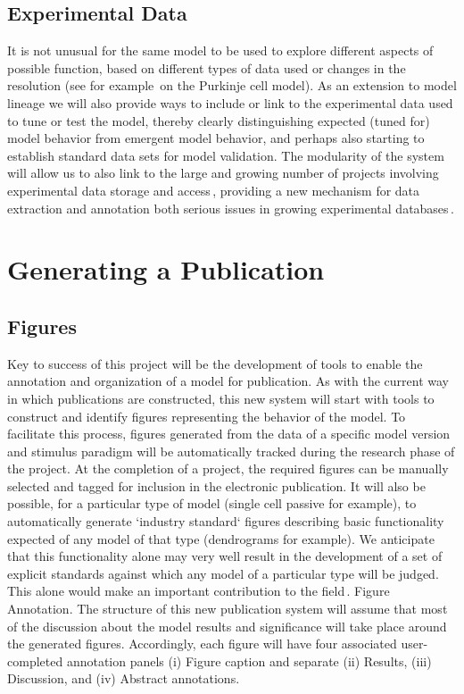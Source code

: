 \documentclass[12pt]{article}
\begin{document}
\subsection*{Experimental Data}

It is not unusual for the same model to be used to explore different aspects of possible function, based on different types of data used or changes in the resolution (see for example\,\cite{De-Schutter-E:1994vn, E:1994hc, schutter94:_simul_purkin, schutter94:_simul_purkin} on the Purkinje cell model). As an extension to model lineage we will also provide ways to include or link to the experimental data used to tune or test the model, thereby clearly distinguishing expected (tuned for) model behavior from emergent model behavior, and perhaps also starting to establish standard data sets for model validation.  The modularity of the system will allow us to also link to the large and growing number of projects involving experimental data storage and access\,\cite{Kaspirzhny:2002qo, Lucas:2010tw, Neylon:2009il}, providing a new mechanism for data extraction and annotation both serious issues in growing experimental databases\,\cite{Cerrito:2008zt}.

\section*{Generating a Publication}

\subsection*{Figures}

Key to success of this project will be the development of tools to enable the annotation and organization of a model for publication. As with the current way in which publications are constructed, this new system will start with tools to construct and identify figures representing the behavior of the model. To facilitate this process, figures generated from the data of a specific model version and stimulus paradigm will be automatically tracked during the research phase of the project. At the completion of a project, the required figures can be manually selected and tagged for inclusion in the electronic publication. It will also be possible, for a particular type of model (single cell passive for example), to automatically generate `industry standard` figures describing basic functionality expected of any model of that type (dendrograms for example).  We anticipate that this functionality alone may very well result in the development of a set of explicit standards against which any model of a particular type will be judged.  This alone would make an important contribution to the field\,\cite{Nickerson:2009uq, Sauro:2008gb}. 
Figure Annotation. The structure of this new publication system will assume that most of the discussion about the model results and significance will take place around the generated figures.  Accordingly, each figure will have four associated user-completed annotation panels (i) Figure caption and separate (ii) Results, (iii) Discussion, and (iv) Abstract annotations.
\end{document}
